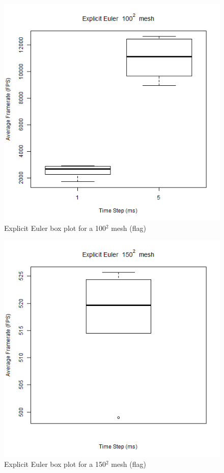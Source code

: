       \begin{figure}
    \begin{center}
      \includegraphics[scale=.9]{Figures/flag_ee_100_box}
    \end{center}
    \caption{Explicit Euler box plot for a 100$^{2}$ mesh (flag)}
    \label{fig:ee box 100 flag}
  \end{figure}
  
      \begin{figure}
    \begin{center}
      \includegraphics[scale=.9]{Figures/flag_ee_150_box}
    \end{center}
    \caption{Explicit Euler box plot for a 150$^{2}$ mesh (flag)}
    \label{fig:ee box 150 flag}
  \end{figure}
  
